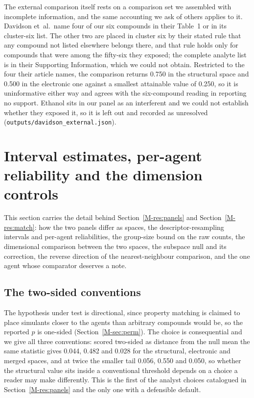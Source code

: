 \documentclass[11pt,a4paper]{article}
\begin{document}
The external comparison itself rests on a comparison set we assembled with
incomplete information, and the same accounting we ask of others applies to it.
Davidson et~al.\ name four of our six compounds in their Table~1 or in its
cluster-six list. The other two are placed in cluster six by their stated rule
that any compound not listed elsewhere belongs there, and that rule holds only
for compounds that were among the fifty-six they exposed; the complete analyte
list is in their Supporting Information, which we could not obtain. Restricted
to the four their article names, the comparison returns 0.750 in the structural
space and 0.500 in the electronic one against a smallest attainable value of
0.250, so it is uninformative either way and agrees with the six-compound
reading in reporting no support. Ethanol sits in our panel as an interferent
and we could not establish whether they exposed it, so it is left out and
recorded as unresolved (\texttt{outputs/davidson\_external.json}).

\section{Interval estimates, per-agent reliability and the dimension controls}
\label{res:paneldetail}

This section carries the detail behind Section~\ref{M-res:panels} and
Section~\ref{M-res:match}: how the two panels differ as spaces, the
descriptor-resampling intervals and per-agent reliabilities, the group-size
bound on the raw counts, the dimensional comparison between the two spaces,
the subspace null and its correction, the reverse direction of the
nearest-neighbour comparison, and the one agent whose comparator deserves a
note.

\subsection{The two-sided conventions}

The hypothesis under test is directional, since property matching is claimed to
place simulants closer to the agents than arbitrary compounds would be, so the
reported $p$ is one-sided (Section~\ref{M-sec:perm}). The choice is
consequential and we give all three conventions: scored two-sided as distance
from the null mean the same statistic gives 0.044, 0.482 and 0.028 for the
structural, electronic and merged spaces, and at twice the smaller tail 0.056,
0.550 and 0.050, so whether the structural value sits inside a conventional
threshold depends on a choice a reader may make differently. This is the first
of the analyst choices catalogued in Section~\ref{M-res:panels} and the only one
with a defensible default.
\end{document}
